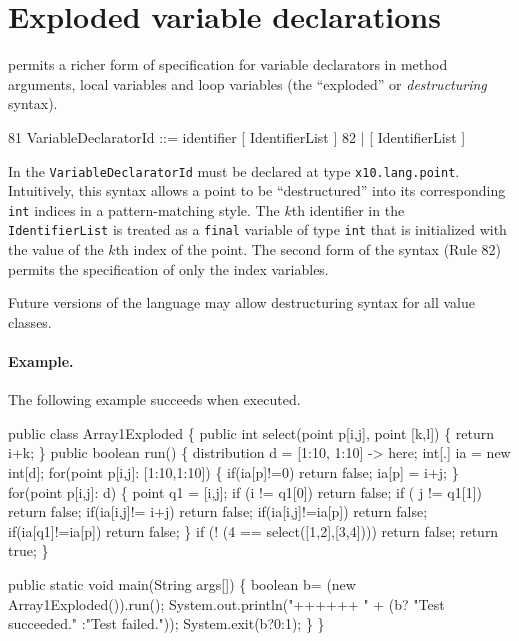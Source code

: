 \section{Exploded variable declarations}\label{exploded-syntax}

\Xten{} permits a richer form of specification for variable
declarators in method arguments, local variables and loop variables
(the ``exploded'' or {\em destructuring} syntax).
\begin{x10}
81    VariableDeclaratorId ::= 
           identifier [ IdentifierList ]
82       | [ IdentifierList ]
\end{x10}
In \XtenCurrVer{} the {\tt VariableDeclaratorId} must be declared at
type {\tt x10.lang.point}. Intuitively, this syntax allows a
point to be ``destructured'' into its corresponding {\tt int} 
indices in a pattern-matching style.
The $k$th identifier in the {\tt
IdentifierList} is treated as a {\tt final} variable of type {\tt int}
that is initialized with the value of the $k$th index of the point. 
The second form of the syntax (Rule 82) permits the specification of only
the index variables.

Future versions of the language may allow destructuring syntax for all
value classes.

\paragraph{Example.}
The following example succeeds when executed.
\begin{x10}
public class Array1Exploded \{
  public int select(point p[i,j], point [k,l]) \{
      return i+k;
  \}
  public boolean run() \{
    distribution d =  [1:10, 1:10] -> here;
    int[.] ia = new int[d];
    for(point p[i,j]: [1:10,1:10]) \{
        if(ia[p]!=0) return false;
        ia[p] = i+j;
    \}
    for(point p[i,j]: d) \{
      point q1 = [i,j];
      if (i != q1[0]) return false;
      if ( j != q1[1]) return false;
      if(ia[i,j]!= i+j) return false;
      if(ia[i,j]!=ia[p]) return false;
      if(ia[q1]!=ia[p]) return false;
   \}
    if (! (4 == select([1,2],[3,4]))) return false;
     return true;
   \}
        
  public static void main(String args[]) \{
     boolean b= (new Array1Exploded()).run();
     System.out.println("++++++ "
                        + (b? "Test succeeded."
                           :"Test failed."));
     System.exit(b?0:1);
 \}
\}
\end{x10}

 \par  %



